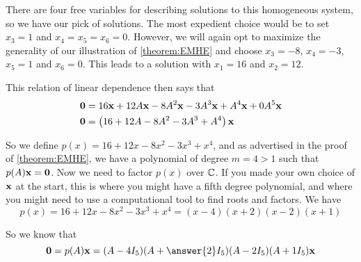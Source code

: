 \documentclass{ximera}
\begin{document}
\begin{example}
There are four free variables for describing solutions to this
homogeneous system, so we have our pick of solutions.  The most
expedient choice would be to set $x_3=1$ and $x_4=x_5=x_6=0$.
However, we will again opt to maximize the generality of our
illustration of \ref{theorem:EMHE} and choose $x_3=-8$, $x_4=-3$,
$x_5=1$ and $x_6=0$.  This leads to a solution with $x_1=16$ and
$x_2=12$.

This relation of linear dependence then says that
\begin{align*}
\mathbf{0}&=16\mathbf{x}+12A\mathbf{x}-8A^2\mathbf{x}-3A^3\mathbf{x}+A^4\mathbf{x}+0A^5\mathbf{x}\\
\mathbf{0}&=\left(16+12A-8A^2-3A^3+A^4\right)\mathbf{x}
\end{align*}

So we define $p(x)=16+12x-8x^2-3x^3+x^4$, and as advertised in the
proof of \ref{theorem:EMHE}, we have a polynomial of degree $m=4>1$
such that $p(A)\mathbf{x}=\mathbf{0}$.  Now we need to factor $p(x)$
over $\mathbb{C}$.  If you made your own choice of $\mathbf{x}$ at the
start, this is where you might have a fifth degree polynomial, and
where you might need to use a computational tool to find roots and
factors.  We have
\[
p(x)=16+12x-8x^2-3x^3+x^4=(x-4)(x+2)(x-2)(x+1)
\]

So we know that
\[
\zerovector=p(A)\vect{x}=(A-4I_5)(A+\answer{2}I_5)(A-2I_5)(A+1I_5)\vect{x}
\]


\end{example}
\end{document}
